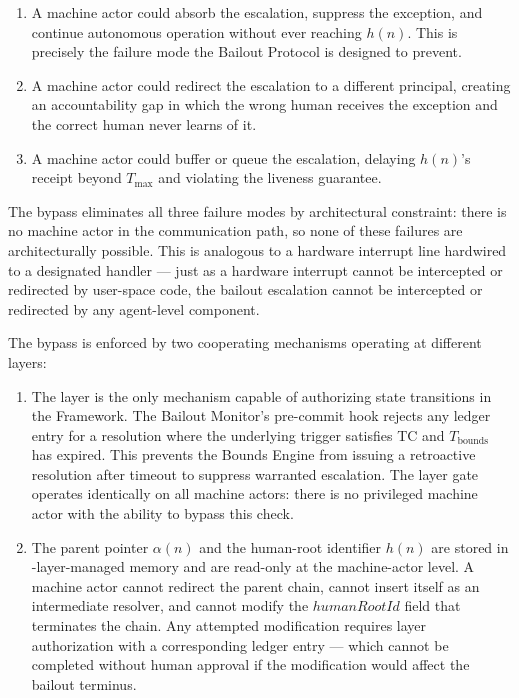 \begin{enumerate}
\item[\textbf{Intercept.}] A machine actor could absorb the escalation, suppress the exception, and continue autonomous operation without ever reaching $h(n)$. This is precisely the failure mode the Bailout Protocol is designed to prevent.

\item[\textbf{Redirect.}] A machine actor could redirect the escalation to a different principal, creating an accountability gap in which the wrong human receives the exception and the correct human never learns of it.

\item[\textbf{Delay.}] A machine actor could buffer or queue the escalation, delaying $h(n)$'s receipt beyond $T_{\text{max}}$ and violating the liveness guarantee.
\end{enumerate}

The bypass eliminates all three failure modes by architectural constraint: there is no machine actor in the communication path, so none of these failures are architecturally possible. This is analogous to a hardware interrupt line hardwired to a designated handler — just as a hardware interrupt cannot be intercepted or redirected by user-space code, the bailout escalation cannot be intercepted or redirected by any agent-level component.

The bypass is enforced by two cooperating mechanisms operating at different layers:

\begin{enumerate}
\item[\textbf{Fact Layer gate.}] The \fact{} layer is the only mechanism capable of authorizing state transitions in the \bxthree{} Framework. The Bailout Monitor's pre-commit hook rejects any ledger entry for a resolution where the underlying trigger satisfies TC and $T_{\text{bounds}}$ has expired. This prevents the Bounds Engine from issuing a retroactive resolution after timeout to suppress warranted escalation. The \fact{} layer gate operates identically on all machine actors: there is no privileged machine actor with the ability to bypass this check.

\item[\textbf{Immutable parent-pointer and human-root architecture.}] The parent pointer $\alpha(n)$ and the human-root identifier $h(n)$ are stored in \fact-layer-managed memory and are read-only at the machine-actor level. A machine actor cannot redirect the parent chain, cannot insert itself as an intermediate resolver, and cannot modify the $humanRootId$ field that terminates the chain. Any attempted modification requires \purpose{} layer authorization with a corresponding ledger entry — which cannot be completed without human approval if the modification would affect the bailout terminus.
\end{enumerate}

